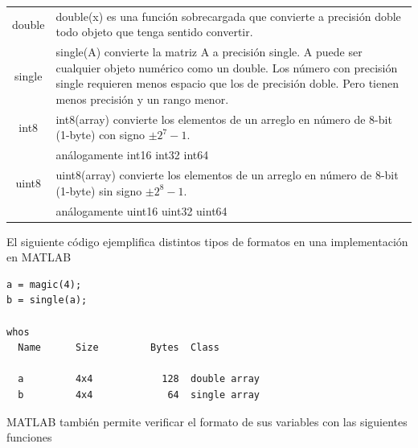 \documentclass[11pt]{article}
\begin{document}
\begin{longtable}{|c||p{}|}
\hline
double	& double(x) es una funci\'on sobrecargada que convierte a precisi\'on doble todo objeto que tenga sentido convertir. \\
single 	& single(A) convierte la matriz A a precisi\'on single. A puede ser cualquier objeto num\'erico como un double. Los n\'umero con precisi\'on single requieren menos espacio que los de precisi\'on doble. Pero tienen menos precisi\'on y un rango menor.\\
int8 	& int8(array) convierte los elementos de un arreglo en n\'umero de 8-bit (1-byte)  con signo $\pm 2^7-1$. \\	
& an\'alogamente 
int16	
int32
int64\\
uint8 & uint8(array) convierte los elementos de un arreglo en n\'umero de 8-bit (1-byte)  sin signo $\pm 2^8-1$. \\	
& an\'alogamente 
uint16
uint32
uint64\\
\hline
\end{longtable}

El siguiente c\'odigo ejemplifica distintos tipos de formatos en una implementaci\'on en MATLAB

\begin{verbatim}
a = magic(4);
b = single(a);

whos
  Name      Size         Bytes  Class

  a         4x4            128  double array
  b         4x4             64  single array
\end{verbatim}

MATLAB tambi\'en permite verificar el formato de sus variables con las siguientes funciones 
\end{document}
